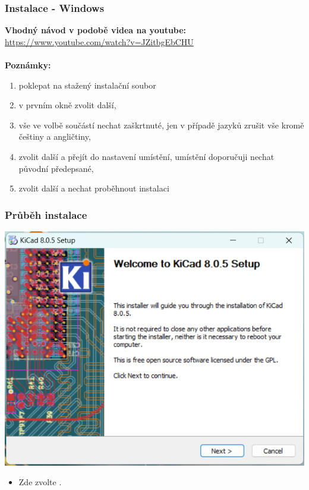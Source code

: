 \documentclass{beamer}
\begin{document}
	\begin{frame}
    \frametitle{Instalace - Windows}
    	\textbf{Vhodný návod v podobě videa na youtube:} \url{https://www.youtube.com/watch?v=JZitbgEbCHU} \\~\\
    	
    	\textbf{Poznámky:}
		\begin{enumerate}
			\item poklepat na stažený instalační soubor
			\item v prvním okně zvolit další,
			\item vše ve volbě součástí nechat zaškrtnuté, jen v případě jazyků zrušit vše kromě češtiny a angličtiny,
			\item zvolit další a přejít do nastavení umístění, umístění doporučuji nechat původní předepsané,
			\item zvolit další a nechat proběhnout instalaci
		\end{enumerate}
		
	\end{frame}
	\begin{frame}
    \frametitle{Průběh instalace}
		\begin{center}
			\includegraphics[scale=0.5]{obr/kicad_inst1.png}
		\end{center}
		
		\begin{itemize}
			\item Zde zvolte .
		\end{itemize}
	\end{frame}
\end{document}
